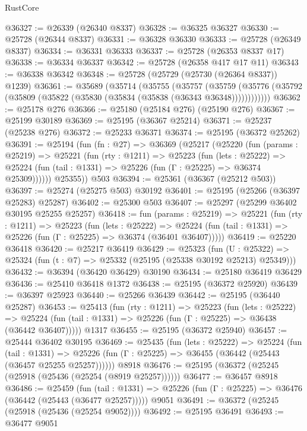 \begin{lexlean}{RustCore}
\begin{coremodule}
@36327 := @26339 (@26340 @8337)
@36328 := @36325 @36327
@36330 := @25728 (@26344 @8337)
@36331 := @36328 @36330
@36333 := @25728 (@26349 @8337)
@36334 := @36331 @36333
@36337 := @25728 (@26353 @8337 @17)
@36338 := @36334 @36337
@36342 := @25728 (@26358 @417 @17 @11)
@36343 := @36338 @36342
@36348 := @25728 (@25729 (@25730 (@26364 @8337)) @1239)
@36361 := @35689
    (@35714
      (@35755
        (@35757
          (@35759 (@35776 (@35792 (@35809 (@35822 (@35830 (@35834 (@35838 (@36343 @36348))))))))))))
@36362 := @25178 @276
@36366 := @25180 (@25184 @276) (@25190 @276)
@36367 := @25199 @30189
@36369 := @25195 (@36367 @25214)
@36371 := @25237 (@25238 @276)
@36372 := @25233 @36371
@36374 := @25195 (@36372 @25262)
@36391 := @25194
    (fun (fn : @27) =>
    @36369
      (@25217
        (@25220
          (fun (params : @25219) =>
          @25221
            (fun (rty : @1211) =>
            @25223
              (fun (lets : @25222) =>
              @25224 (fun (tail : @1331) => @25226 (fun (Γ : @25225) => @36374 @25309))))))
        @25355))
    @503
@36394 := @25361 (@36367 (@25212 @503))
@36397 := @25274 (@25275 @503) @30192
@36401 := @25195 (@25266 (@36397 @25283) @25287)
@36402 := @25300 @503
@36407 := @25297 (@25299 @36402 @30195 @25255 @25257)
@36418 := fun (params : @25219) =>
  @25221
    (fun (rty : @1211) =>
    @25223
      (fun (lets : @25222) =>
      @25224 (fun (tail : @1331) => @25226 (fun (Γ : @25225) => @36374 (@36401 @36407)))))
@36419 := @25220 @36418
@36420 := @25217 @36419
@36429 := @25323
    (fun (U : @25322) => @25324 (fun (t : @7) => @25332 (@25195 (@25338 @30192 @25213) @25349)))
@36432 := @36394 (@36420 @36429) @30190
@36434 := @25180 @36419 @36429
@36436 := @25410 @36418 @1372
@36438 := @25195 (@36372 @25920)
@36439 := @36397 @25923
@36440 := @25266 @36439
@36442 := @25195 (@36440 @25287)
@36453 := @25413
    (fun (rty : @1211) =>
    @25223
      (fun (lets : @25222) =>
      @25224 (fun (tail : @1331) => @25226 (fun (Γ : @25225) => @36438 (@36442 @36407)))))
    @1317
@36455 := @25195 (@36372 @25940)
@36457 := @25444 @36402 @30195
@36469 := @25435
    (fun (lets : @25222) =>
    @25224
      (fun (tail : @1331) =>
      @25226 (fun (Γ : @25225) => @36455 (@36442 (@25443 (@36457 @25255 @25257))))))
    @8918
@36476 := @25195 (@36372 (@25245 (@25918 (@25436 (@25254 (@8919 @25257))))))
@36477 := @36457 @8918
@36486 := @25459
    (fun (tail : @1331) => @25226 (fun (Γ : @25225) => @36476 (@36442 (@25443 (@36477 @25257)))))
    @9051
@36491 := @36372 (@25245 (@25918 (@25436 (@25254 @9052))))
@36492 := @25195 @36491
@36493 := @36477 @9051

\end{coremodule}
\end{lexlean}
